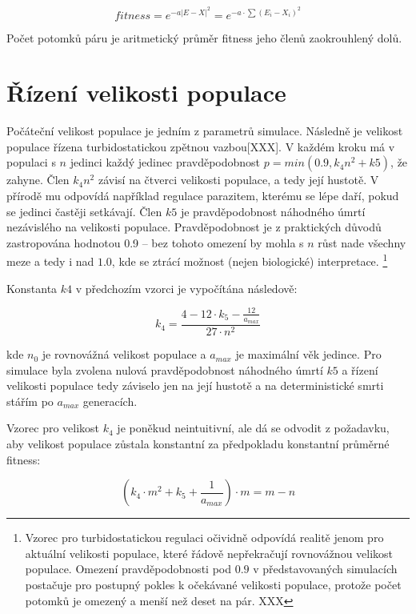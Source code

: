 \begin{equation}
fitness = e^{-a |E-X|^2} = e^{-a\cdot{\sum{(E_i - X_i)^2}}}
\end{equation}

Počet potomků páru je aritmetický průměr fitness jeho členů zaokrouhlený dolů.


\section{Řízení velikosti populace}

Počáteční velikost populace je jedním z parametrů simulace. Následně je velikost populace řízena turbidostatickou
zpětnou vazbou[XXX]. V každém kroku má v populaci s $n$ jedinci každý jedinec pravděpodobnost
$p = min(0.9, k_4 n^2 + k5)$, že zahyne. Člen $k_4 n^2$ závisí na čtverci velikosti populace, a tedy její hustotě.
V přírodě mu odpovídá například regulace parazitem, kterému se lépe daří, pokud se jedinci častěji setkávají.
Člen $k5$ je pravděpodobnost náhodného úmrtí nezávislého na velikosti populace. Pravděpodobnost je z praktických důvodů
zastropována hodnotou 0.9 -- bez tohoto omezení by mohla s $n$ růst nade všechny meze a tedy i nad $1.0$, kde se ztrácí
možnost (nejen biologické) interpretace.
\footnote{Vzorec pro turbidostatickou regulaci očividně odpovídá realitě jenom pro aktuální velikosti populace,
které řádově nepřekračují rovnovážnou velikost populace. Omezení pravděpodobnosti pod $0.9$ v představovaných
simulacích postačuje pro postupný pokles k očekávané velikosti populace, protože počet potomků je omezený a
menší než deset na pár. XXX}

Konstanta $k4$ v předchozím vzorci je vypočítána následově:

\begin{equation}
k_4 = \frac{4 - 12\cdot{}{k_5} - \frac{12}{a_{max}}}
           {27\cdot{}n^2}
\end{equation}


kde $n_0$ je rovnovážná velikost populace a $a_{max}$ je maximální věk jedince.
Pro simulace byla zvolena nulová pravděpodobnost náhodného úmrtí $k5$ a řízení velikosti populace tedy záviselo jen na
její hustotě a na deterministické smrti stářím po $a_{max}$ generacích.

Vzorec pro velikost $k_4$ je poněkud neintuitivní, ale dá se odvodit z požadavku, aby velikost populace zůstala
konstantní za předpokladu konstantní průměrné fitness:

\begin{equation}
(k_4\cdot{m^2} + {k_5} + \frac{1}{a_{max}})\cdot{m} = m - n
\end{equation}

